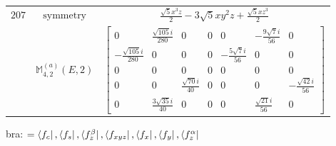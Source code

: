 \documentclass[fleqn,8pt,landscape]{jsarticle}
\begin{document}
\begin{longtable}{ccc}
$ 207 $ & $ \text{symmetry} $ & $ \frac{\sqrt{5} x^{3} z}{2} - 3 \sqrt{5} x y^{2} z + \frac{\sqrt{5} x z^{3}}{2} $ \\
$  $ & $ \mathbb{M}_{4,2}^{(a)}(E,2) $ & $ \begin{bmatrix} 0 & \frac{\sqrt{105} i}{280} & 0 & 0 & 0 & - \frac{9 \sqrt{7} i}{56} & 0 \\ - \frac{\sqrt{105} i}{280} & 0 & 0 & 0 & - \frac{5 \sqrt{7} i}{56} & 0 & 0 \\ 0 & 0 & 0 & 0 & 0 & 0 & 0 \\ 0 & 0 & \frac{\sqrt{70} i}{40} & 0 & 0 & 0 & - \frac{\sqrt{42} i}{56} \\ 0 & \frac{3 \sqrt{35} i}{40} & 0 & 0 & 0 & \frac{\sqrt{21} i}{56} & 0 \end{bmatrix} $ \\ \hline
\end{longtable}
bra: $=\bra{f_{c}}, \bra{f_{s}}, \bra{f_{z}^{\beta}}, \bra{f_{xyz}}, \bra{f_{x}}, \bra{f_{y}}, \bra{f_{z}^{\alpha}}$
\end{document}
